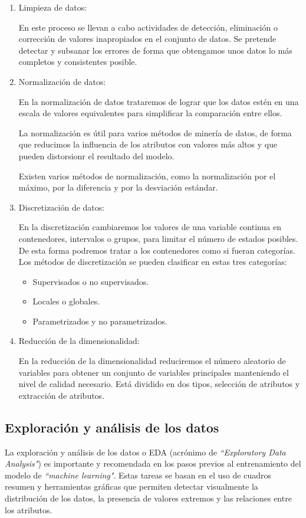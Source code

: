 \begin{enumerate}
    \item Limpieza de datos:
    
En este proceso se llevan a cabo actividades de detección, eliminación o corrección de valores inapropiados en el conjunto de datos. Se pretende detectar y subsanar los errores de forma que obtengamos unos datos lo más completos y consistentes posible.

    \item Normalización de datos:
    
En la normalización de datos trataremos de lograr que los datos estén en una escala de valores equivalentes para simplificar la comparación entre ellos.

La normalización es útil para varios métodos de minería de datos, de forma que reducimos la influencia de los atributos con valores más altos y que pueden distorsionr el resultado del modelo.


Existen varios métodos de normalización, como la normalización por el máximo, por la diferencia y por la desviación estándar.

    \item Discretización de datos:
    
    
En la discretización cambiaremos los valores de una variable continua en contenedores, intervalos o grupos, para limitar el número de estados posibles. 
De esta forma podremos tratar a los contenedores como si fueran categorías.
Los métodos de discretización se pueden clasificar en estas tres categorías:
\begin{itemize}
    \item Supervisados o no supervisados.
    \item Locales o globales.
    \item Parametrizados y no parametrizados.
\end{itemize}

    \item Reducción de la dimensionalidad:
    
En la reducción de la dimensionalidad reduciremos el número aleatorio de variables para obtener un conjunto de variables principales manteniendo el nivel de calidad necesario. Está dividido en dos tipos, selección de atributos y extracción de atributos.

\end{enumerate}

\subsection{Exploración y análisis de los datos}
La exploración y análisis de los datos o EDA (acrónimo  de \textit{``Exploratory Data Analysis"}) es importante y recomendada en los pasos previos al entrenamiento del modelo de \textit{``machine learning"}. Estas tareas se basan en el uso de cuadros resumen y herramientas gráficas que permiten detectar visualmente la distribución de los datos, la presencia de valores extremos y las relaciones entre los atributos.

